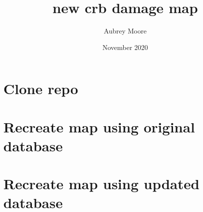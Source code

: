 \documentclass{scrartcl}
\title{new crb damage map}
\author{Aubrey Moore}
\date{November 2020}
\begin{document}
\maketitle

\section{Clone repo}



\section{Recreate map using original database}

\section{Recreate map using updated database}
\end{document}
